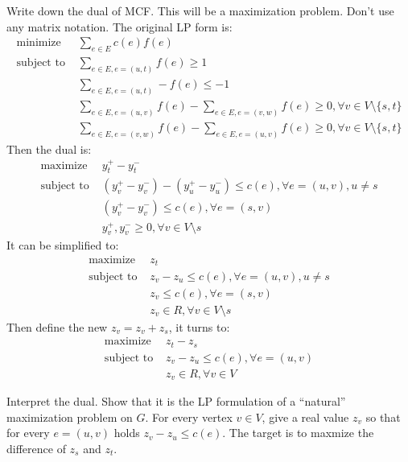 \documentclass[11pt,a4paper,oneside]{article}
\begin{document}
\begin{problem}{3}
	\statement
    Write down the dual of MCF. This will be a maximization problem. Don't use any matrix notation.
    \solution
    The original LP form is:
	$$	
	\begin {align*}
	\text{minimize } & \sum_{e\in E}c(e)f(e) \\
	\text{subject to } & \sum_{e\in E,e=(u,t)}f(e)\geq 1 \\
	& \sum_{e\in E,e=(u,t)}-f(e)\leq -1 \\
	& \sum_{e\in E,e=(u,v)}f(e)-\sum_{e\in E,e=(v,w)}f(e)\geq 0, 
	\forall v\in V\setminus \{s,t\} \\
	& \sum_{e\in E,e=(v,w)}f(e)-\sum_{e\in E,e=(u,v)}f(e)\geq 0, 
	\forall v\in V\setminus \{s,t\} 
	\end {align*}
	$$
	Then the dual is:
	$$
	\begin {align*}
	\text{maximize } & y_t^+-y_t^- \\
	\text{subject to } & (y_v^+-y_v^-)-(y_u^+-y_u^-)\leq c(e),\forall e=(u,v),u\neq s\\
	& (y_v^+-y_v^-)\leq c(e),\forall e=(s,v)\\
	& y_v^+,y_v^-\geq 0,\forall v\in V\setminus s 
	\end {align*}
	$$
	It can be simplified to:
	$$
	\begin {align*}
	\text{maximize } & z_t \\
	\text{subject to } & z_v-z_u\leq c(e),\forall e=(u,v),u\neq s\\
	& z_v\leq c(e),\forall e=(s,v)\\
	& z_v\in R,\forall v\in V\setminus s 
	\end {align*}
	$$
	Then define the new $z_v=z_v+z_s$, it turns to:
	$$
	\begin {align*}
	\text{maximize } & z_t-z_s \\
	\text{subject to } & z_v-z_u\leq c(e),\forall e=(u,v)\\
	& z_v\in R,\forall v\in V 
	\end {align*}
	$$
\end{problem}
\begin{problem}{4}
	\statement
   Interpret the dual. Show that it is the LP formulation of a ``natural'' maximization problem on $G$.
   \solution
	For every vertex $v\in V$, give a real value $z_v$ so that for every $e=(u,v)$ holds $z_v-z_u\leq c(e)$. The target is to maxmize the difference of $z_s$ and $z_t$.
\end{problem}
\end{document}
